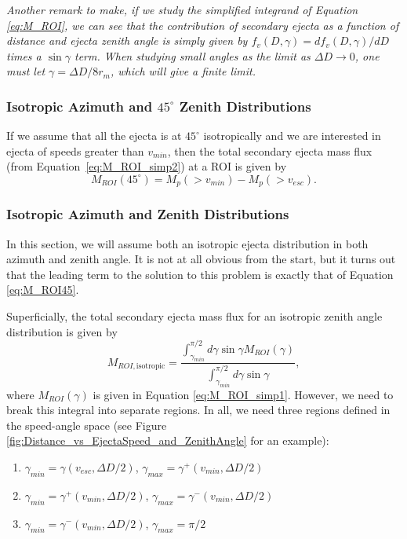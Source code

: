 \documentclass{hitec}
\numberwithin{equation}{section}
\begin{document}
\textit{Another remark to make, if we study the simplified integrand of Equation \eqref{eq:M_ROI}, we can see that the contribution of secondary ejecta as a function of distance and ejecta zenith angle is simply given by
$f_v(D,\gamma) = df_v(D,\gamma)/dD$ times a $\sin\gamma$ term. When studying small angles as the limit as $\Delta D\to 0$, one must let $\gamma=\Delta D/8r_m$, which will give a finite limit.}


\subsubsection{Isotropic Azimuth and $45^\circ$ Zenith Distributions}\label{sssec:IsoAzm45Zen}
If we assume that all the ejecta is at $45^\circ$ isotropically and we are interested in ejecta of speeds greater than $v_{min}$, then the total secondary ejecta mass flux (from Equation~\eqref{eq:M_ROI_simp2}) at a ROI is given by
\begin{equation}\label{eq:M_ROI45}
M_{ROI}(45^\circ) = M_p(>v_{min}) - M_p(>v_{esc}).
\end{equation}


\subsubsection{Isotropic Azimuth and Zenith Distributions}
In this section, we will assume both an isotropic ejecta distribution in both azimuth and zenith angle. It is not at all obvious from the start, but it turns out that the leading term to the solution to this problem is exactly that of Equation \eqref{eq:M_ROI45}.

Superficially, the total secondary ejecta mass flux for an isotropic zenith angle distribution is given by
\begin{equation}\label{eq:M_ROIiso1}
M_{ROI,\text{isotropic}} = \frac{\int_{\gamma_{min}}^{\pi/2}d\gamma\sin\gamma M_{ROI}(\gamma)}{\int_{\gamma_{min}}^{\pi/2}d\gamma\sin\gamma},
\end{equation}
where $M_{ROI}(\gamma)$ is given in Equation \eqref{eq:M_ROI_simp1}. However, we need to break this integral into separate regions. In all, we need three regions defined in the speed-angle space (see Figure \ref{fig:Distance_vs_EjectaSpeed_and_ZenithAngle} for an example):
\begin{enumerate}[label=Region \Roman*:]
	\item $\gamma_{min} = \gamma(v_{esc},\Delta D/2)$, $\gamma_{max} = \gamma^+(v_{min}, \Delta D/2)$
	\item $\gamma_{min} = \gamma^+(v_{min}, \Delta D/2)$, $\gamma_{max} = \gamma^-(v_{min}, \Delta D/2)$
	\item $\gamma_{min} = \gamma^-(v_{min}, \Delta D/2)$, $\gamma_{max} = \pi/2$
\end{enumerate}
\end{document}
